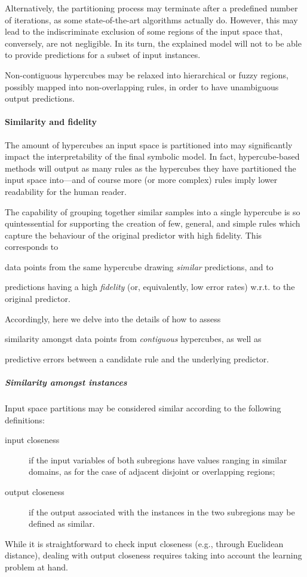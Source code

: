 \documentclass[
]{ceurart}
\begin{document}
Alternatively, the partitioning process may terminate after a predefined number of iterations, as some state-of-the-art algorithms actually do.
%
However, this may lead to the indiscriminate exclusion of some regions of the input space that, conversely, are not negligible.
%
In its turn, the explained model will not to be able to provide predictions for a subset of input instances.

Non-contiguous hypercubes may be relaxed into hierarchical or fuzzy regions, possibly mapped into non-overlapping rules, in order to have unambiguous output predictions.

\paragraph{Similarity and fidelity}

The amount of hypercubes an input space is partitioned into may significantly impact the interpretability of the final symbolic model.
%
In fact, hypercube-based methods will output as many rules as the hypercubes they have partitioned the input space into---and of course more (or more complex) rules imply lower readability for the human reader.

The capability of grouping together similar samples into a single hypercube is so quintessential for supporting the creation of few, general, and simple rules which capture the behaviour of the original predictor with high fidelity.
%
This corresponds to
%
\begin{inlinelist}
	\item data points from the same hypercube drawing \emph{similar} predictions, and to
	\item predictions having a high \emph{fidelity} (or, equivalently, low error rates) w.r.t. to the original predictor.
\end{inlinelist}
%
Accordingly, here we delve into the details of how to assess
%
\begin{inlinelist}
	\item similarity amongst data points from \emph{contiguous} hypercubes, as well as
	\item predictive errors between a candidate rule and the underlying predictor.
\end{inlinelist}

\subparagraph{Similarity amongst instances}

Input space partitions may be considered similar according to the following definitions:
%
\begin{description}
	\item[input closeness] if the input variables of both subregions have values ranging in similar domains, as for the case of adjacent disjoint or overlapping regions;
	\item[output closeness] if the output associated with the instances in the two subregions may be defined as similar.
\end{description}
%
While it is straightforward to check input closeness (e.g., through Euclidean distance), dealing with output closeness requires taking into account the learning problem at hand.
\end{document}
